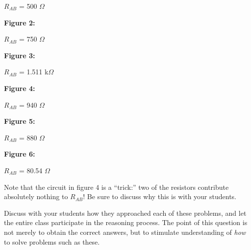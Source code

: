 $R_{AB}$ = 500 $\Omega$

\vskip 10pt

{\bf Figure 2:}

$R_{AB}$ = 750 $\Omega$

\vskip 10pt

{\bf Figure 3:}

$R_{AB}$ = 1.511 k$\Omega$

\vskip 10pt

{\bf Figure 4:}

$R_{AB}$ = 940 $\Omega$

\vskip 10pt

{\bf Figure 5:}

$R_{AB}$ = 880 $\Omega$

\vskip 10pt

{\bf Figure 6:}

$R_{AB}$ = 80.54 $\Omega$

\vskip 10pt

Note that the circuit in figure 4 is a ``trick:'' two of the resistors contribute absolutely nothing to $R_{AB}$!  Be sure to discuss why this is with your students.

Discuss with your students how they approached each of these problems, and let the entire class participate in the reasoning process.  The point of this question is not merely to obtain the correct answers, but to stimulate understanding of {\it how} to solve problems such as these.




